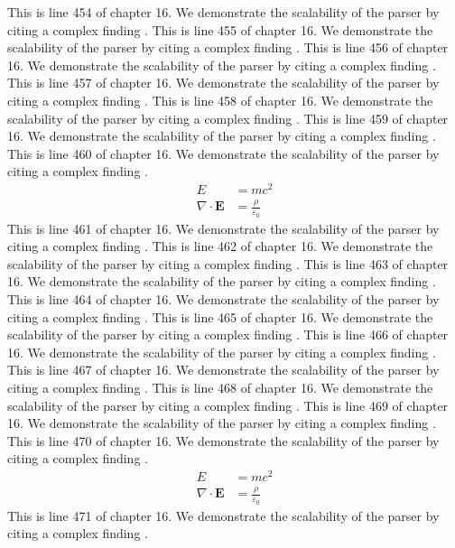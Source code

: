 This is line 454 of chapter 16. We demonstrate the scalability of the parser by citing a complex finding \cite{ref16_454}.
This is line 455 of chapter 16. We demonstrate the scalability of the parser by citing a complex finding \cite{ref16_455}.
This is line 456 of chapter 16. We demonstrate the scalability of the parser by citing a complex finding \cite{ref16_456}.
This is line 457 of chapter 16. We demonstrate the scalability of the parser by citing a complex finding \cite{ref16_457}.
This is line 458 of chapter 16. We demonstrate the scalability of the parser by citing a complex finding \cite{ref16_458}.
This is line 459 of chapter 16. We demonstrate the scalability of the parser by citing a complex finding \cite{ref16_459}.
This is line 460 of chapter 16. We demonstrate the scalability of the parser by citing a complex finding \cite{ref16_460}.
\begin{align*}
  E &= mc^2 \\
  \nabla \cdot \mathbf{E} &= \frac{\rho}{\varepsilon_0}
\end{align*}
This is line 461 of chapter 16. We demonstrate the scalability of the parser by citing a complex finding \cite{ref16_461}.
This is line 462 of chapter 16. We demonstrate the scalability of the parser by citing a complex finding \cite{ref16_462}.
This is line 463 of chapter 16. We demonstrate the scalability of the parser by citing a complex finding \cite{ref16_463}.
This is line 464 of chapter 16. We demonstrate the scalability of the parser by citing a complex finding \cite{ref16_464}.
This is line 465 of chapter 16. We demonstrate the scalability of the parser by citing a complex finding \cite{ref16_465}.
This is line 466 of chapter 16. We demonstrate the scalability of the parser by citing a complex finding \cite{ref16_466}.
This is line 467 of chapter 16. We demonstrate the scalability of the parser by citing a complex finding \cite{ref16_467}.
This is line 468 of chapter 16. We demonstrate the scalability of the parser by citing a complex finding \cite{ref16_468}.
This is line 469 of chapter 16. We demonstrate the scalability of the parser by citing a complex finding \cite{ref16_469}.
This is line 470 of chapter 16. We demonstrate the scalability of the parser by citing a complex finding \cite{ref16_470}.
\begin{align*}
  E &= mc^2 \\
  \nabla \cdot \mathbf{E} &= \frac{\rho}{\varepsilon_0}
\end{align*}
This is line 471 of chapter 16. We demonstrate the scalability of the parser by citing a complex finding \cite{ref16_471}.
